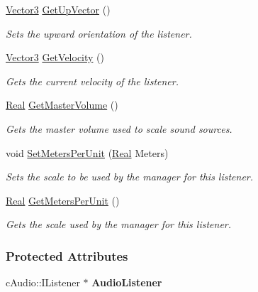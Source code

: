 \begin{DoxyCompactItemize}
\hyperlink{classphys_1_1Vector3}{Vector3} \hyperlink{classphys_1_1SoundListener_aff27f90cad8b2eec53e28d28ee2203c3}{GetUpVector} ()
\begin{DoxyCompactList}\small\item\em Sets the upward orientation of the listener. \item\end{DoxyCompactList}\item 
\hyperlink{classphys_1_1Vector3}{Vector3} \hyperlink{classphys_1_1SoundListener_a6b4bbf974c48ba2028bcf2f943a1b1c2}{GetVelocity} ()
\begin{DoxyCompactList}\small\item\em Gets the current velocity of the listener. \item\end{DoxyCompactList}\item 
\hyperlink{namespacephys_af7eb897198d265b8e868f45240230d5f}{Real} \hyperlink{classphys_1_1SoundListener_a03acbadb9e7ebad0014269bf5c3bcf3d}{GetMasterVolume} ()
\begin{DoxyCompactList}\small\item\em Gets the master volume used to scale sound sources. \item\end{DoxyCompactList}\item 
void \hyperlink{classphys_1_1SoundListener_ae5d432f4e1bf7eb788364e7ea0c4e0a6}{SetMetersPerUnit} (\hyperlink{namespacephys_af7eb897198d265b8e868f45240230d5f}{Real} Meters)
\begin{DoxyCompactList}\small\item\em Sets the scale to be used by the manager for this listener. \item\end{DoxyCompactList}\item 
\hyperlink{namespacephys_af7eb897198d265b8e868f45240230d5f}{Real} \hyperlink{classphys_1_1SoundListener_a97c834a1b8fec9ce3a0e705468d531e5}{GetMetersPerUnit} ()
\begin{DoxyCompactList}\small\item\em Gets the scale used by the manager for this listener. \item\end{DoxyCompactList}\end{DoxyCompactItemize}
\subsubsection*{Protected Attributes}
\begin{DoxyCompactItemize}
\item 
\hypertarget{classphys_1_1SoundListener_ada88acce2006736a00c8eb3a428a3e42}{
cAudio::IListener $\ast$ {\bfseries AudioListener}}
\label{classphys_1_1SoundListener_ada88acce2006736a00c8eb3a428a3e42}

\end{DoxyCompactItemize}


